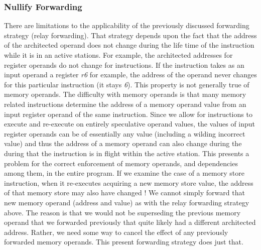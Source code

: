 \documentclass[10pt,dvips]{article}
\begin{document}
\subsubsection{Nullify Forwarding}
%
There are limitations to the applicability of the previously
discussed forwarding strategy (relay forwarding).
That strategy depends upon the fact that the address of the
architected operand does not change during the life time of
the instruction while it is in an active stations.
For example, the architected addresses for register operands
do not change for instructions.  If the instruction takes
as an input operand a register \textit{r6} for example,
the address of the operand never changes for this particular
instruction (it stays \textit{6}).
This property is not generally true of memory operands.
The difficulty with memory operands is that many memory
related instructions determine the address of a memory operand
value from an input register operand of the same instruction.
Since we allow for instructions to execute and re-execute
on entirely speculative operand values, the values of
input register operands can be of essentially any value
(including a wilding incorrect value) and thus the
address of a memory operand can also change during the during
that the instruction is in flight within the active station.
This presents a problem for the correct enforcement of
memory operands, and dependencies among them, in the entire program.
If we examine the case of a memory store instruction,
when it
re-executes acquiring a new memory store value, the address of that
memory store may also have changed !  
We cannot simply forward that new memory operand (address and value)
as with the relay forwarding strategy above.  The reason is
that we would not be superseding the previous memory operand
that we forwarded previously that quite likely had a different
architected address.  Rather, we need some way to cancel the effect of
any previously forwarded memory operands.
This present forwarding strategy does just that.
\end{document}
